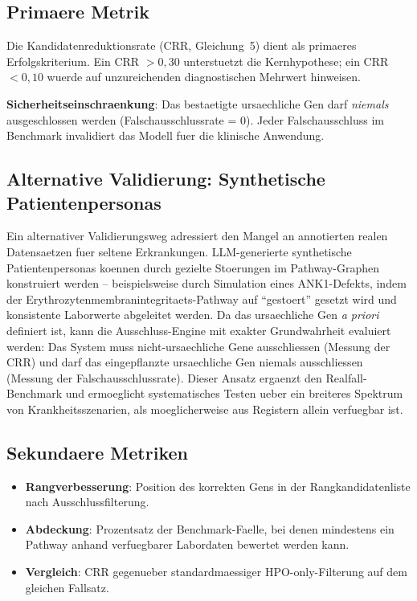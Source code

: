 \documentclass[12pt,a4paper]{article}
\begin{document}
\subsection*{Primaere Metrik}

Die Kandidatenreduktionsrate (CRR, Gleichung~5) dient als primaeres Erfolgskriterium. Ein CRR $> 0{,}30$ unterstuetzt die Kernhypothese; ein CRR $< 0{,}10$ wuerde auf unzureichenden diagnostischen Mehrwert hinweisen.

\textbf{Sicherheitseinschraenkung}: Das bestaetigte ursaechliche Gen darf \emph{niemals} ausgeschlossen werden (Falschausschlussrate = 0). Jeder Falschausschluss im Benchmark invalidiert das Modell fuer die klinische Anwendung.

\subsection*{Alternative Validierung: Synthetische Patientenpersonas}

Ein alternativer Validierungsweg adressiert den Mangel an annotierten realen Datensaetzen fuer seltene Erkrankungen. LLM-generierte synthetische Patientenpersonas koennen durch gezielte Stoerungen im Pathway-Graphen konstruiert werden -- beispielsweise durch Simulation eines ANK1-Defekts, indem der Erythrozytenmembranintegritaets-Pathway auf "`gestoert"' gesetzt wird und konsistente Laborwerte abgeleitet werden. Da das ursaechliche Gen \emph{a priori} definiert ist, kann die Ausschluss-Engine mit exakter Grundwahrheit evaluiert werden: Das System muss nicht-ursaechliche Gene ausschliessen (Messung der CRR) und darf das eingepflanzte ursaechliche Gen niemals ausschliessen (Messung der Falschausschlussrate). Dieser Ansatz ergaenzt den Realfall-Benchmark und ermoeglicht systematisches Testen ueber ein breiteres Spektrum von Krankheitsszenarien, als moeglicherweise aus Registern allein verfuegbar ist.

\subsection*{Sekundaere Metriken}

\begin{itemize}
    \item \textbf{Rangverbesserung}: Position des korrekten Gens in der Rangkandidatenliste nach Ausschlussfilterung.
    \item \textbf{Abdeckung}: Prozentsatz der Benchmark-Faelle, bei denen mindestens ein Pathway anhand verfuegbarer Labordaten bewertet werden kann.
    \item \textbf{Vergleich}: CRR gegenueber standardmaessiger HPO-only-Filterung auf dem gleichen Fallsatz.
\end{itemize}
\end{document}
